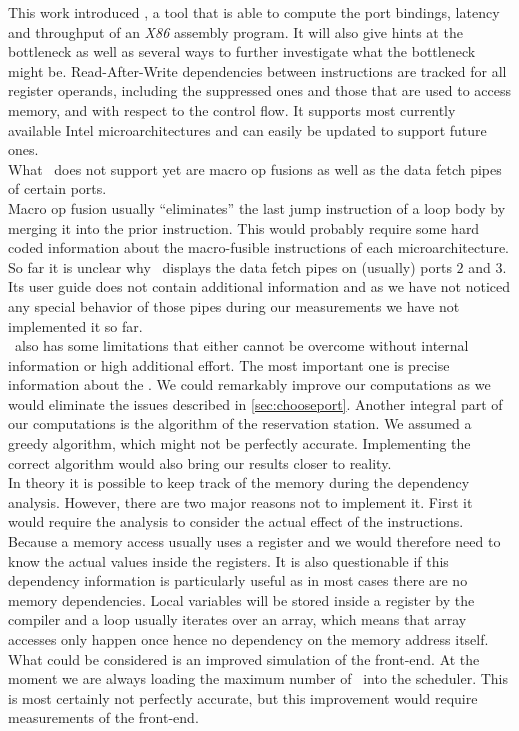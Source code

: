 This work introduced \suaca, a tool that is able to compute the port bindings, latency and throughput of an \emph{X86} assembly program. It will also give hints at the bottleneck as well as several ways to further investigate what the bottleneck might be. Read-After-Write dependencies between instructions are tracked for all register operands, including the suppressed ones and those that are used to access memory, and with respect to the control flow. It supports most currently available Intel microarchitectures and can easily be updated to support future ones.\\

What \suaca\ does not support yet are macro op fusions as well as the data fetch pipes of certain ports.\\
Macro op fusion usually ``eliminates'' the last jump instruction of a loop body by merging it into the prior instruction. This would probably require some hard coded information about the macro-fusible instructions of each microarchitecture.\\
So far it is unclear why \iaca\ displays the data fetch pipes on (usually) ports $2$ and $3$. Its user guide does not contain additional information and as we have not noticed any special behavior of those pipes during our measurements we have not implemented it so far.\\

\suaca\ also has some limitations that either cannot be overcome without internal information or high additional effort.
The most important one is precise information about the \microops. We could remarkably improve our computations as we would eliminate the issues described in \autoref{sec:chooseport}. Another integral part of our computations is the algorithm of the reservation station. We assumed a greedy algorithm, which might not be perfectly accurate. Implementing the correct algorithm would also bring our results closer to reality.\\
In theory it is possible to keep track of the memory during the dependency analysis. However, there are two major reasons not to implement it. First it would require the analysis to consider the actual effect of the instructions. Because a memory access usually uses a register and we would therefore need to know the actual values inside the registers. It is also questionable if this dependency information is particularly useful as in most cases there are no memory dependencies. Local variables will be stored inside a register by the compiler and a loop usually iterates over an array, which means that array accesses only happen once hence no dependency on the memory address itself.\\
What could be considered is an improved simulation of the front-end. At the moment we are always loading the maximum number of \microops\ into the scheduler. This is most certainly not perfectly accurate, but this improvement would require measurements of the front-end.